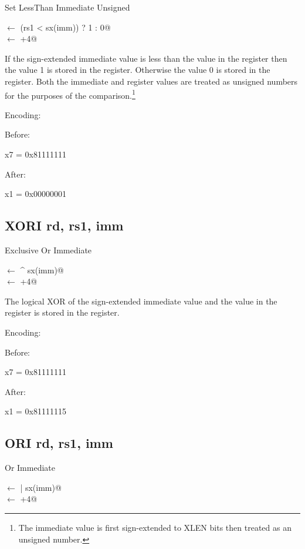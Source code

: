 Set LessThan Immediate Unsigned

\verb@rd@ $\leftarrow$ \verb@(rs1 < sx(imm)) ? 1 : 0@\\
\verb@pc@ $\leftarrow$ \verb@pc+4@

If the sign-extended immediate value is less than the value
in the  register then the value 1 is stored in the 
 register.  Otherwise the value 0 is stored in the
 register.  Both the immediate and  register
values are treated as unsigned numbers for the purposes of the 
comparison.\footnote{The immediate value is first sign-extended to
XLEN bits then treated as an unsigned number.\cite[p.~14]{rvismv1v22:2017}}


Encoding:


Before:

x7 = 0x81111111

After:

x1 = 0x00000001

\subsection{XORI rd, rs1, imm}

Exclusive Or Immediate

\verb@rd@ $\leftarrow$  ^ sx(imm)@\\
\verb@pc@ $\leftarrow$ \verb@pc+4@

The logical XOR of the sign-extended immediate value and the value 
in the  register is stored in the  register.

Encoding:


Before:

x7 = 0x81111111

After:

x1 = 0x81111115

\subsection{ORI rd, rs1, imm}

Or Immediate

\verb@rd@ $\leftarrow$  | sx(imm)@\\
\verb@pc@ $\leftarrow$ \verb@pc+4@

